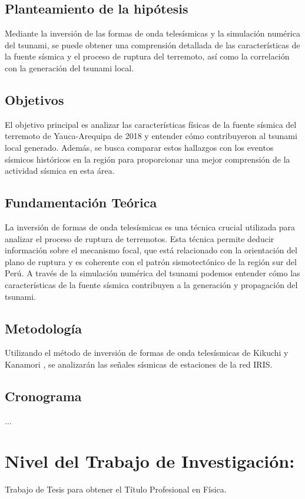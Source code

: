 \documentclass[spanish,a4paper,11pt]{article}
\begin{document}
\subsection*{Planteamiento de la hipótesis}
Mediante la inversión de las formas de onda telesísmicas y la simulación numérica del tsunami, se puede obtener una comprensión detallada de las características de la fuente sísmica y el proceso de ruptura del terremoto, así como la correlación con la generación del tsunami local.

\subsection*{Objetivos} 
El objetivo principal es analizar las características físicas de la fuente sísmica del terremoto de Yauca-Arequipa de 2018 y entender cómo contribuyeron al tsunami local generado. Además, se busca comparar estos hallazgos con los eventos sísmicos históricos en la región para proporcionar una mejor comprensión de la actividad sísmica en esta área.

\subsection{Fundamentación Teórica} 
La inversión de formas de onda telesísmicas es una técnica crucial utilizada para analizar el proceso de ruptura de terremotos. Esta técnica permite deducir información sobre el mecanismo focal, que está relacionado con la orientación del plano de ruptura y es coherente con el patrón sismotectónico de la región sur del Perú. A través de la simulación numérica del tsunami podemos entender cómo las características de la fuente sísmica contribuyen a la generación y propagación del tsunami.

\subsection{Metodología} 
Utilizando el método de inversión de formas de onda telesísmicas de Kikuchi y Kanamori \cite{Kik2003}, se analizarán las señales sísmicas de estaciones de la red IRIS.

\subsection{Cronograma}
...

\section{Nivel del Trabajo de Investigación:}
Trabajo de Tesis para obtener el Título Profesional en Física.
\end{document}
